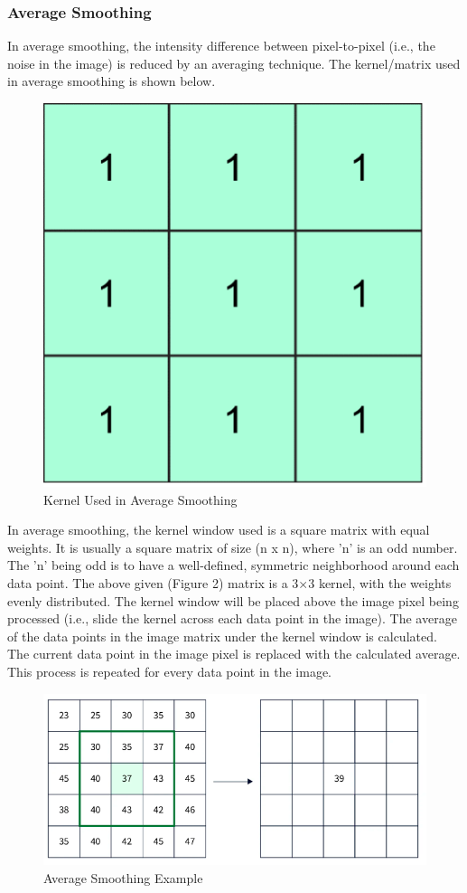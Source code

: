 \documentclass[10pt]{article}
\begin{document}
\begin{multicols}{2}
\subsubsection{Average Smoothing}
In average smoothing, the intensity difference between pixel-to-pixel (i.e., the noise in the image) is reduced by an averaging technique. The kernel/matrix used in average smoothing is shown below.
\begin{figure}[H]
    \centering
    \includegraphics[width=0.7\linewidth]{Images/Week 3/average-kernel.png}
    \caption{Kernel Used in Average Smoothing}
\end{figure}
In average smoothing, the kernel window used is a square matrix with equal weights. It is usually a square matrix of size (n x n), where 'n' is an odd number. The 'n' being odd is to have a well-defined, symmetric neighborhood around each data point. The above given (Figure 2) matrix is a 3×3 kernel, with the weights evenly distributed.
\newline \newline
The kernel window will be placed above the image pixel being processed (i.e., slide the kernel across each data point in the image). The average of the data points in the image matrix under the kernel window is calculated. The current data point in the image pixel is replaced with the calculated average. This process is repeated for every data point in the image.
\begin{figure}[H]
    \centering
    \includegraphics[width=1\linewidth]{Images/Week 3/average-ex.png}
    \caption{Average Smoothing Example}
\end{figure}


\end{multicols}
\end{document}
